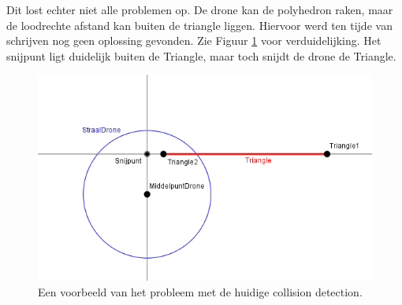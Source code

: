 
\noindent
Dit lost echter niet alle problemen op. De drone kan de polyhedron raken, maar de loodrechte afstand kan buiten de triangle liggen. Hiervoor werd ten tijde van schrijven nog geen oplossing gevonden. Zie Figuur \ref{fig:CollisionDetectionProbleem} voor verduidelijking. Het snijpunt ligt duidelijk buiten de Triangle, maar toch snijdt de drone de Triangle.
\begin{figure}[h]
	\includegraphics[width=1\textwidth]{CollisionDetectionProbleem.png}
	\caption{Een voorbeeld van het probleem met de huidige collision detection.\\ }
	\label{fig:CollisionDetectionProbleem}
\end{figure}